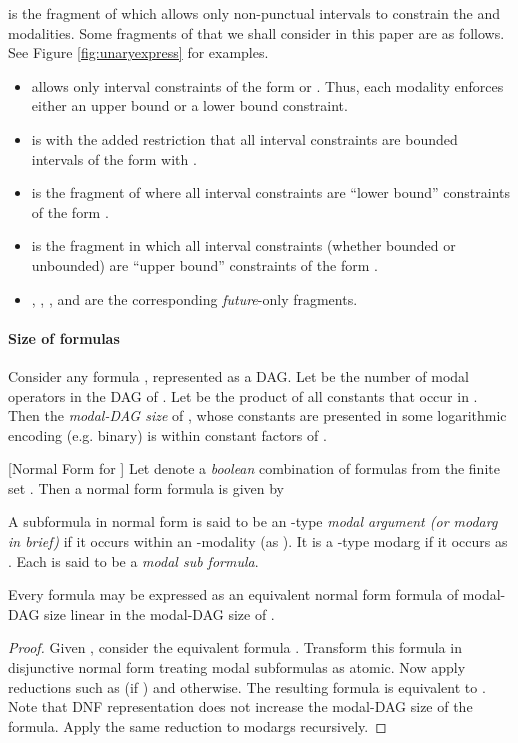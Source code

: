 \documentclass{llncs}
\newcommand{\mtlfp}{\mbox{}}
\newcommand{\mitlfp}{\mbox{}}
\newcommand{\bmitlfp}{\mbox{}}
\newcommand{\mitlf}{\mbox{}}
\newcommand{\mitlfpinf}{\mbox{}}
\newcommand{\mitlfpb}{\bmitlfp}
\newcommand{\mitlfb}{\mbox{}}
\newcommand{\mitlfpzinf}{\mbox{}}
\newcommand{\mitlfzinf}{\mbox{}}
\newcommand{\mitlfinf}{\mbox{}}
\newcommand{\mitlfpz}{\mbox{}}
\newcommand{\mitlfz}{\mbox{}}
\begin{document}
\mitlfp\/ is the fragment of \mtlfp\/ which allows only non-punctual intervals to constrain the  and  modalities. Some fragments of \mitlfp\/ that we shall consider in this paper are as follows. See Figure \ref{fig:unaryexpress} for examples.
\begin{itemize}
\item \mitlfpzinf allows only interval constraints of the form  or . Thus, each modality enforces either an upper bound or a lower bound constraint.  
\item \mitlfpb\/ is \mitlfp\/ with the added restriction that all interval constraints are bounded intervals of the form  with . 
\item \mitlfpinf\/ is the fragment of \mitlfp\/ where all interval constraints are ``lower bound'' constraints of the form . 
\item \mitlfpz\/ is the fragment in which all interval constraints (whether bounded or unbounded) are ``upper bound'' constraints of the form .
\item \mitlf, \mitlfzinf, \mitlfb, \mitlfinf\/ and \mitlfz\/ are the corresponding \emph{future}-only fragments. 
\end{itemize}

\paragraph{Size of \mitlfp\/ formulas}
Consider any \mitlfp\/ formula , represented as a DAG. Let  be the number of modal operators in the DAG of . Let  be the product of all constants that occur in . Then the \emph{modal-DAG size}  of , whose constants are presented in some logarithmic encoding (e.g. binary) is within constant factors of . 



\begin{definition}{[Normal Form for \mitlfp]}
\label{def:norm}
Let  denote a {\em boolean} combination of formulas from the finite set . Then a normal form formula  is given by 


\end{definition}
A subformula  in normal form is said to be an -type \emph{modal argument (or modarg in brief)} if it occurs within an -modality (as ).  It is a -type modarg if it occurs as . Each  is said to be a \emph{modal sub formula}.

\begin{proposition}\label{prop:norm}
Every \mitlfp\/ formula  may be expressed as an equivalent normal form formula  of modal-DAG size linear in the  modal-DAG size of .
\end{proposition}
\begin{proof}
Given , consider the equivalent formula . Transform this formula in disjunctive normal form treating modal subformulas as atomic. Now apply reductions such as 
 (if ) and  otherwise. The resulting formula is equivalent to .
Note that  DNF representation does not increase the modal-DAG size of the formula. Apply the same reduction to modargs recursively.  
\end{proof}
\end{document}

